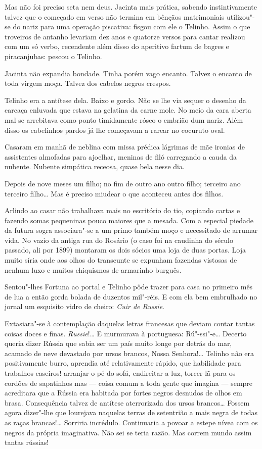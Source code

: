 Mas não foi preciso seta nem deus. Jacinta mais prática, sabendo
instintivamente talvez que o começado em verso não termina em bênçãos
matrimoniais utilizou"-se do nariz para uma operação piscativa: fisgou
com ele o Telinho. Assim o que troveiros de antanho levariam dez anos e
quatorze versos para cantar realizou com um só verbo, recendente além
disso do aperitivo fartum de bagres e piracanjubas: pescou o Telinho.

Jacinta não expandia bondade. Tinha porém vago encanto. Talvez o encanto
de toda virgem moça. Talvez dos cabelos negros crespos.

Telinho era a antítese dela. Baixo e gordo. Não se lhe via sequer o
desenho da carcaça enluvada que estava na gelatina da carne mole. No
meio da cara aberta mal se arrebitava como ponto timidamente róseo o
embrião dum nariz. Além disso os cabelinhos pardos já lhe começavam a
rarear no cocuruto oval.

Casaram em manhã de neblina com missa prédica lágrimas de mãe ironias de
assistentes almofadas para ajoelhar, meninas de filó carregando a cauda
da nubente. Nubente simpática receosa, quase bela nesse dia.

Depois de nove meses um filho; no fim de outro ano outro filho; terceiro
ano terceiro filho\ldots{} Mas é preciso miudear o que aconteceu antes dos
filhos.

Arlindo ao casar não trabalhava mais no escritório do tio, copiando
cartas e fazendo somas pequeninas pouco maiores que a mesada. Com a
especial piedade da futura sogra associara"-se a um primo também moço e
necessitado de arrumar vida. No vazio da antiga rua do Rosário (o caso
foi na caudinha do século passado, ali por 1899) montaram os dois sócios
uma loja de duas portas. Loja muito síria onde aos olhos do transeunte
se expunham fazendas vistosas de nenhum luxo e muitos chiquismos de
armarinho burguês.

Sentou"-lhes Fortuna ao portal e Telinho pôde trazer para casa no
primeiro mês de lua a então gorda bolada de duzentos mil"-réis. E com ela
bem embrulhado no jornal um esquisito vidro de cheiro: \emph{Cuir de
Russie}.

Extasiara"-se à contemplação daquelas letras francesas que deviam contar
tantas coisas doces e finas. \emph{Russie}!\ldots{} E murmurava à portuguesa:
Rú"-ssi"-e\ldots{} Decerto queria dizer Rússia que sabia ser um país muito
longe por detrás do mar, acamado de neve devastado por ursos brancos,
Nossa Senhora!\ldots{} Telinho não era positivamente burro, aprendia até
relativamente rápido, que habilidade para trabalhos caseiros! arranjar o
pé do sofá, endireitar a luz, torcer lã para os cordões de sapatinhos
mas --- coisa comum a toda gente que imagina --- sempre acreditara que a
Rússia era habitada por fortes negros desnudos de olhos em brasa.
Consequência talvez de antítese aterrorizada dos ursos brancos\ldots{} Fossem
agora dizer"-lhe que lourejava naquelas terras de setentrião a mais negra
de todas as raças brancas!\ldots{} Sorriria incrédulo. Continuaria a povoar a
estepe nívea com os negros da própria imaginativa. Não sei se teria
razão. Mas correm mundo assim tantas rússias!

